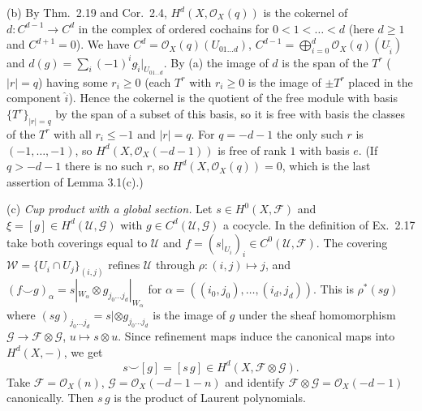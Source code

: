 \documentclass[11pt]{article}
\begin{document}
(b) By Thm.~2.19 and Cor.~2.4, $H^d(X,\mathcal O_X(q))$ is the cokernel of $d:C^{d-1}\to C^d$ in the complex of ordered cochains for $0<1<\dots<d$ (here $d\ge1$ and $C^{d+1}=0$). We have $C^d=\mathcal O_X(q)(U_{01\dots d})$, $C^{d-1}=\bigoplus_{i=0}^d\mathcal O_X(q)(U_{\hat i})$ and $d(g)=\sum_i(-1)^ig_{\hat i}|_{U_{01\dots d}}$. By (a) the image of $d$ is the span of the $T^r$ ($|r|=q$) having some $r_i\ge0$ (each $T^r$ with $r_i\ge0$ is the image of $\pm T^r$ placed in the component $\hat i$). Hence the cokernel is the quotient of the free module with basis $\{T^r\}_{|r|=q}$ by the span of a subset of this basis, so it is free with basis the classes of the $T^r$ with all $r_i\le-1$ and $|r|=q$. For $q=-d-1$ the only such $r$ is $(-1,\dots,-1)$, so $H^d(X,\mathcal O_X(-d-1))$ is free of rank $1$ with basis $e$. (If $q>-d-1$ there is no such $r$, so $H^d(X,\mathcal O_X(q))=0$, which is the last assertion of Lemma 3.1(c).)

(c) \emph{Cup product with a global section.} Let $s\in H^0(X,\mathcal F)$ and $\xi=[g]\in H^d(\mathcal U,\mathcal G)$ with $g\in C^d(\mathcal U,\mathcal G)$ a cocycle. In the definition of Ex.~2.17 take both coverings equal to $\mathcal U$ and $f=(s|_{U_i})_i\in C^0(\mathcal U,\mathcal F)$. The covering $\mathcal W=\{U_i\cap U_j\}_{(i,j)}$ refines $\mathcal U$ through $\rho:(i,j)\mapsto j$, and $(f\smile g)_{\alpha}=s|_{W_\alpha}\otimes g_{j_0\dots j_d}|_{W_\alpha}$ for $\alpha=((i_0,j_0),\dots,(i_d,j_d))$. This is $\rho^*(sg)$ where $(sg)_{j_0\dots j_d}=s|\otimes g_{j_0\dots j_d}$ is the image of $g$ under the sheaf homomorphism $\mathcal G\to\mathcal F\otimes\mathcal G$, $u\mapsto s\otimes u$. Since refinement maps induce the canonical maps into $H^d(X,-)$, we get
\[ s\smile[g]=[s\,g]\in H^d(X,\mathcal F\otimes\mathcal G). \]
Take $\mathcal F=\mathcal O_X(n)$, $\mathcal G=\mathcal O_X(-d-1-n)$ and identify $\mathcal F\otimes\mathcal G=\mathcal O_X(-d-1)$ canonically. Then $s\,g$ is the product of Laurent polynomials.
\end{document}
